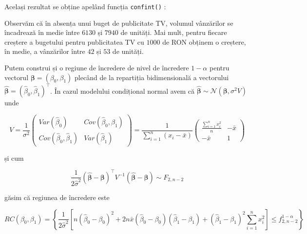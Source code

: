 \documentclass[]{article}
\newenvironment{Shaded}{\begin{snugshade}}{\end{snugshade}}
\newcommand{\KeywordTok}[1]{\textcolor[rgb]{0.13,0.29,0.53}{\textbf{#1}}}
\newcommand{\FloatTok}[1]{\textcolor[rgb]{0.00,0.00,0.81}{#1}}
\newcommand{\OperatorTok}[1]{\textcolor[rgb]{0.81,0.36,0.00}{\textbf{#1}}}
\newcommand{\NormalTok}[1]{#1}
\begin{document}
Același rezultat se obține apelând funcția \texttt{confint()} :

\begin{Shaded}
\end{Shaded}

Observăm că în absența unui buget de publicitate TV, volumul vânzărilor
se încadrează în medie între \(6130\) și \(7940\) de unități. Mai mult,
pentru fiecare creștere a bugetului pentru publicitatea TV cu \(1000\)
de RON obținem o creștere, în medie, a vânzărilor între \(42\) și \(53\)
de unități.

Putem construi și o regiune de încredere de nivel de încredere
\(1-\alpha\) pentru vectorul \(\boldsymbol{\beta} = (\beta_0, \beta_1)\)
plecând de la repartiția bidimensională a vectorului
\(\boldsymbol{\hat \beta} = (\hat \beta_0, \hat \beta_1)^\intercal\). În
cazul modelului condițional normal avem că
\(\boldsymbol{\hat \beta}\sim\mathcal{N}(\boldsymbol{\beta}, \sigma^2 V)\)
unde

\[
  V = \frac{1}{\sigma^2}\begin{pmatrix}Var(\hat \beta_0) & Cov(\hat \beta_0, \hat \beta_1)\\ Cov(\hat \beta_0, \hat \beta_1) & Var(\hat \beta_1)\end{pmatrix} = \frac{1}{\sum_{i = 1}^{n}(x_i - \bar x)}\begin{pmatrix}\frac{\sum_{i = 1}^{n}x_i^2}{n} & -\bar x\\ -\bar x & 1\end{pmatrix}
\]

și cum

\[
\frac{1}{2\hat \sigma^2}\left(\boldsymbol{\hat \beta} - \boldsymbol{\beta}\right)^\intercal V^{-1} \left(\boldsymbol{\hat \beta} - \boldsymbol{\beta}\right) \sim F_{2, n-2}
\]

găsim că regiunea de încredere este

\[
  RC(\beta_0, \beta_1) = \left\{\frac{1}{2\hat\sigma^2}\left[n(\hat\beta_0 - \beta_0)^2 + 2n\bar x(\hat\beta_0 - \beta_0)(\hat\beta_1 - \beta_1) + (\hat\beta_1 - \beta_1)^2\sum_{i=1}^{n}x_i^2\right]\leq f^{1-\alpha}_{2,n-2}\right\}
\]
\end{document}
